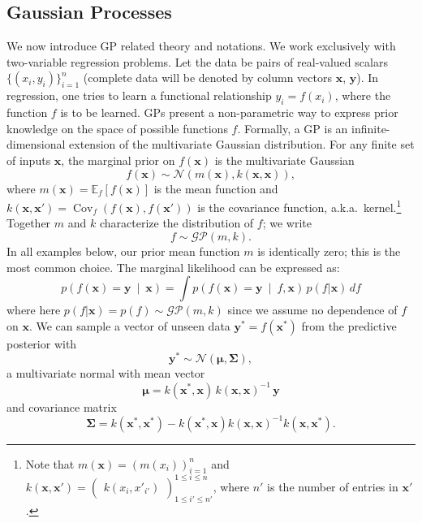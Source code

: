 \documentclass{article} %
\newcommand{\xbf}{\mathbf{x}}
\newcommand{\ybf}{\mathbf{y}}
\newcommand{\pn}[1]{\left( #1 \right)}
\newcommand{\bkt}[1]{\left[ #1 \right]}
\newcommand{\Ebkt}[2][]{\mathbb{E}_{#1}\bkt{#2}}
\newcommand{\mvert}{\ \middle\vert\ }
\DeclareMathOperator*{\Cov}{Cov}
\begin{document}
\subsection{Gaussian Processes}
We now introduce GP related theory and notations.
We work exclusively with two-variable regression problems.
Let the data be pairs of real-valued scalars $\{(x_i,y_i)\}_{i=1}^n$ (complete data will be denoted by column vectors $\mathbf{x}$, $\mathbf{y}$).
In regression, one tries to learn a functional relationship $y_i = f(x_i)$, where the function $f$ is to be learned.
GPs present a non-parametric way to express prior knowledge on the space of possible functions $f$.
Formally, a GP is an infinite-dimensional extension of the multivariate Gaussian distribution.
For any finite set of inputs $\xbf$, the marginal prior on $f(\xbf)$ is the multivariate Gaussian
\[
f(\xbf) \sim \mathcal{N}(m(\xbf), k(\xbf,\xbf)),
\]
where $m(\xbf) = \Ebkt[f]{f(\xbf)}$ is the mean function and $k(\xbf,\xbf') = \Cov_f\pn{f(\xbf), f(\xbf')}$ is the covariance function, a.k.a.\ kernel.\footnote{
  Note that $m(\xbf) = \pn{m(x_i)}_{i=1}^{n}$ and $k(\xbf,\xbf') = \begin{pmatrix} k(x_i,x'_{i'}) \end{pmatrix}^{1 \leq i \leq n}_{1 \leq i' \leq n'}$, where $n'$ is the number of entries in $\xbf'$.
}
Together $m$ and $k$ characterize the distribution of $f$; we write
\[ f \sim \mathcal{GP}(m,k). \]
In all examples below, our prior mean function $m$ is identically zero; this is the most common choice.
The marginal likelihood can be expressed as:
\begin{equation}
\label{eq:marg}
p\pn{f(\xbf) = \ybf \mvert \xbf} = \int p\pn{f(\xbf) = \ybf \mvert f, \xbf}\, p(f|\xbf) \, df
\end{equation}
where here $p(f|\xbf) = p(f) \sim \mathcal{GP}(m,k)$ since we assume no dependence of $f$ on $\xbf$.
We can sample a vector of unseen data $\ybf^* = f(\xbf^*)$ from the predictive posterior with
\begin{equation}
\label{eq:gpsampler}
\ybf^* \sim \mathcal{N}(\bm{\mu},\bm{\Sigma}),
\end{equation}
a multivariate normal with mean vector
\begin{equation}
\label{eq:conditonalGaussianMean}
\bm{\mu} = k(\xbf^*,\xbf)\, k(\xbf,\xbf)^{-1}\, \ybf
\end{equation}
and covariance matrix
\begin{equation}
\label{eq:conditonalGaussianCovariance}
\bm{\Sigma} =  k(\xbf^*,\xbf^*) - k(\xbf^*,\xbf)k(\xbf,\xbf)^{-1} k(\xbf,\xbf^*).
\end{equation}
\end{document}
